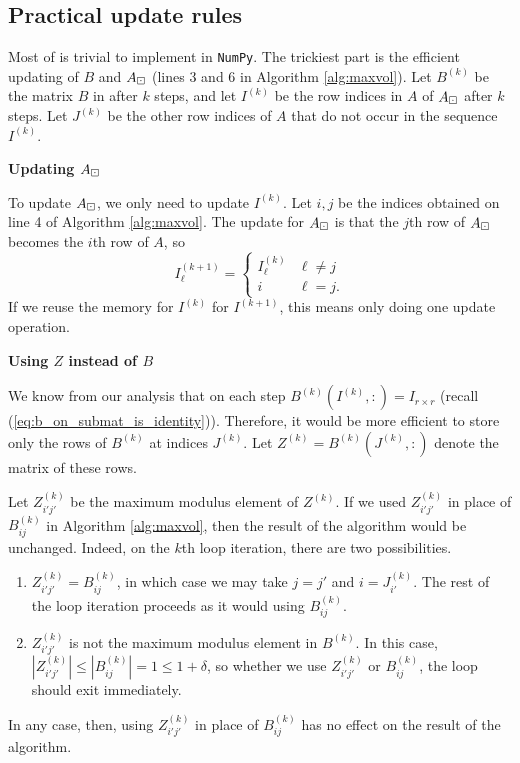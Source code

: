\documentclass{article}
\begin{document}
	\subsection{Practical update rules}
	Most of \maxvol{} is trivial to implement in \texttt{NumPy}. The trickiest part is the efficient updating of $B$ and $A_\boxdot$ (lines 3 and 6 in Algorithm \ref{alg:maxvol}). Let $B^{(k)}$ be the matrix $B$ in \maxvol{} after $k$ steps, and let $I^{(k)}$ be the row indices in $A$ of $A_\boxdot$ after $k$ steps. Let $J^{(k)}$ be the other row indices of $A$ that do not occur in the sequence $I^{(k)}$. 
	
	
	\textbf{Updating $A_\boxdot$}
	
	To update $A_\boxdot$, we only need to update $I^{(k)}$. Let $i,j$ be the indices obtained on line 4 of Algorithm \ref{alg:maxvol}. The update for $A_\boxdot$ is that the $j$th row of $A_\boxdot$ becomes the $i$th row of $A$, so
	\begin{equation}
		I^{(k+1)}_\ell = \begin{cases}
			I^{(k)}_\ell & \ell \ne j \\
			i & \ell = j.
		\end{cases}
	\end{equation}
	If we reuse the memory for $I^{(k)}$ for $I^{(k+1)}$, this means only doing one update operation. 
	
	\textbf{Using $Z$ instead of $B$}
	
	We know from our analysis that on each step $B^{(k)}\left(I^{(k)},:\right) = I_{r\times r}$ (recall (\ref{eq:b_on_submat_is_identity})). Therefore, it would be more efficient to store only the rows of $B^{(k)}$ at indices $J^{(k)}$. Let $Z^{(k)} = B^{(k)}\left(J^{(k)},:\right)$ denote the matrix of these rows.
	
	Let $Z^{(k)}_{i'j'}$ be the maximum modulus element of $Z^{(k)}$. If we used $Z^{(k)}_{i'j'}$ in place of $B^{(k)}_{ij}$ in Algorithm \ref{alg:maxvol}, then the result of the algorithm would be unchanged. Indeed, on the $k$th loop iteration, there are two possibilities.
	\begin{enumerate}
		\item $Z^{(k)}_{i'j'} = B^{(k)}_{ij}$, in which case we may take $j = j'$ and $i = J^{(k)}_{i'}$. The rest of the loop iteration proceeds as it would using $B^{(k)}_{ij}$.
		\item $Z^{(k)}_{i'j'}$ is not the maximum modulus element in $B^{(k)}$. In this case, $\left|Z^{(k)}_{i'j'}\right| \le \left|B^{(k)}_{ij}\right| = 1 \le 1 + \delta$, so whether we use $Z^{(k)}_{i'j'}$ or $B^{(k)}_{ij}$, the loop should exit immediately.
	\end{enumerate}
	In any case, then, using $Z^{(k)}_{i'j'}$ in place of $B^{(k)}_{ij}$ has no effect on the result of the algorithm.
	
\end{document}
